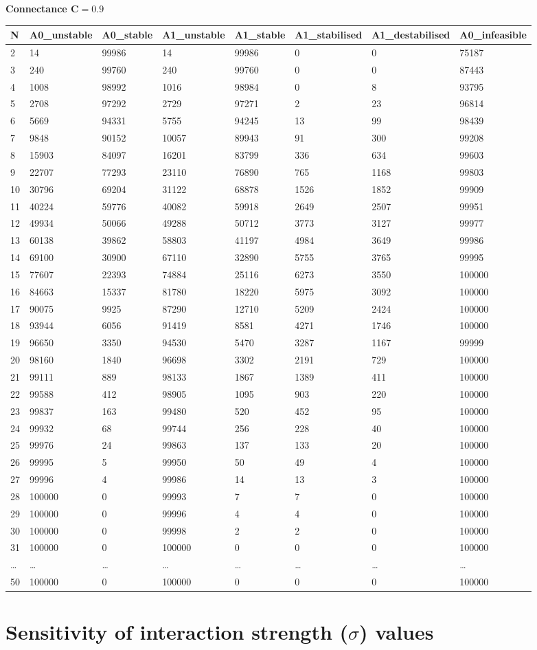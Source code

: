 \documentclass[]{article}
\begin{document}
\textbf{Connectance \(\mathbf{C = 0.9}\)}

\begin{longtable}[]{@{}llllllll@{}}
\toprule
N & A0\_unstable & A0\_stable & A1\_unstable & A1\_stable &
A1\_stabilised & A1\_destabilised & A0\_infeasible\tabularnewline
\midrule
\endhead
2 & 14 & 99986 & 14 & 99986 & 0 & 0 & 75187\tabularnewline
3 & 240 & 99760 & 240 & 99760 & 0 & 0 & 87443\tabularnewline
4 & 1008 & 98992 & 1016 & 98984 & 0 & 8 & 93795\tabularnewline
5 & 2708 & 97292 & 2729 & 97271 & 2 & 23 & 96814\tabularnewline
6 & 5669 & 94331 & 5755 & 94245 & 13 & 99 & 98439\tabularnewline
7 & 9848 & 90152 & 10057 & 89943 & 91 & 300 & 99208\tabularnewline
8 & 15903 & 84097 & 16201 & 83799 & 336 & 634 & 99603\tabularnewline
9 & 22707 & 77293 & 23110 & 76890 & 765 & 1168 & 99803\tabularnewline
10 & 30796 & 69204 & 31122 & 68878 & 1526 & 1852 & 99909\tabularnewline
11 & 40224 & 59776 & 40082 & 59918 & 2649 & 2507 & 99951\tabularnewline
12 & 49934 & 50066 & 49288 & 50712 & 3773 & 3127 & 99977\tabularnewline
13 & 60138 & 39862 & 58803 & 41197 & 4984 & 3649 & 99986\tabularnewline
14 & 69100 & 30900 & 67110 & 32890 & 5755 & 3765 & 99995\tabularnewline
15 & 77607 & 22393 & 74884 & 25116 & 6273 & 3550 & 100000\tabularnewline
16 & 84663 & 15337 & 81780 & 18220 & 5975 & 3092 & 100000\tabularnewline
17 & 90075 & 9925 & 87290 & 12710 & 5209 & 2424 & 100000\tabularnewline
18 & 93944 & 6056 & 91419 & 8581 & 4271 & 1746 & 100000\tabularnewline
19 & 96650 & 3350 & 94530 & 5470 & 3287 & 1167 & 99999\tabularnewline
20 & 98160 & 1840 & 96698 & 3302 & 2191 & 729 & 100000\tabularnewline
21 & 99111 & 889 & 98133 & 1867 & 1389 & 411 & 100000\tabularnewline
22 & 99588 & 412 & 98905 & 1095 & 903 & 220 & 100000\tabularnewline
23 & 99837 & 163 & 99480 & 520 & 452 & 95 & 100000\tabularnewline
24 & 99932 & 68 & 99744 & 256 & 228 & 40 & 100000\tabularnewline
25 & 99976 & 24 & 99863 & 137 & 133 & 20 & 100000\tabularnewline
26 & 99995 & 5 & 99950 & 50 & 49 & 4 & 100000\tabularnewline
27 & 99996 & 4 & 99986 & 14 & 13 & 3 & 100000\tabularnewline
28 & 100000 & 0 & 99993 & 7 & 7 & 0 & 100000\tabularnewline
29 & 100000 & 0 & 99996 & 4 & 4 & 0 & 100000\tabularnewline
30 & 100000 & 0 & 99998 & 2 & 2 & 0 & 100000\tabularnewline
31 & 100000 & 0 & 100000 & 0 & 0 & 0 & 100000\tabularnewline
\ldots{} & \ldots{} & \ldots{} & \ldots{} & \ldots{} & \ldots{} &
\ldots{} & \ldots{}\tabularnewline
50 & 100000 & 0 & 100000 & 0 & 0 & 0 & 100000\tabularnewline
\bottomrule
\end{longtable}

\hypertarget{sigma}{%
\section{\texorpdfstring{Sensitivity of interaction strength
(\(\sigma\))
values}{Sensitivity of interaction strength (\textbackslash{}sigma) values}}\label{sigma}}
\end{document}
